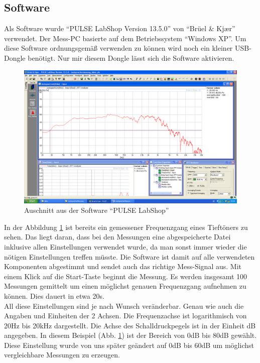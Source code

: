 \subsection{Software}\label{subsec:5.2.1}
Als Software wurde \enquote{PULSE LabShop Version 13.5.0} von \enquote{Brüel \& Kj\ae r} verwendet. Der Mess-PC basierte auf dem Betriebssystem \enquote{Windows XP}. Um diese Software ordnungsgemäß verwenden zu können wird noch ein kleiner USB-Dongle benötigt. Nur mir diesem Dongle lässt sich die Software aktivieren.
\begin{figure} [H]
	\centering
	\includegraphics[width=1\textwidth]{img/LSMessung/VisatonMitSilikonMitWolle.png}
	\caption{Auschnitt aus der Software \enquote{PULSE LabShop}}
	\label{fig:5.2.1.1}
\end{figure}
In der Abbildung \ref{fig:5.2.1.1} ist bereits ein gemessener Frequenzgang eines Tieftöners zu sehen. Das liegt daran, dass bei den Messungen eine abgespeicherte Datei inklusive allen Einstellungen verwendet wurde, da man sonst immer wieder die nötigen Einstellungen treffen müsste. Die Software ist damit auf alle verwendeten Komponenten abgestimmt und sendet auch das richtige Mess-Signal aus. Mit einem Klick auf die Start-Taste beginnt die Messung. Es werden insgesamt 100 Messungen gemittelt um einen möglichst genauen Frequenzgang aufnehmen zu können. Dies dauert in etwa 20s. \\
All diese Einstellungen sind je nach Wunsch veränderbar. Genau wie auch die Angaben und Einheiten der 2 Achsen. Die Frequenzachse ist logarithmisch von 20Hz bis 20kHz dargestellt. Die Achse des Schalldruckpegels ist in der Einheit dB angegeben. In diesem Beispiel (Abb. \ref{fig:5.2.1.1}) ist der Bereich von 0dB bis 80dB gewählt. Diese Einstellung wurde von uns später geändert auf 0dB bis 60dB um möglichst vergleichbare Messungen zu erzeugen.

